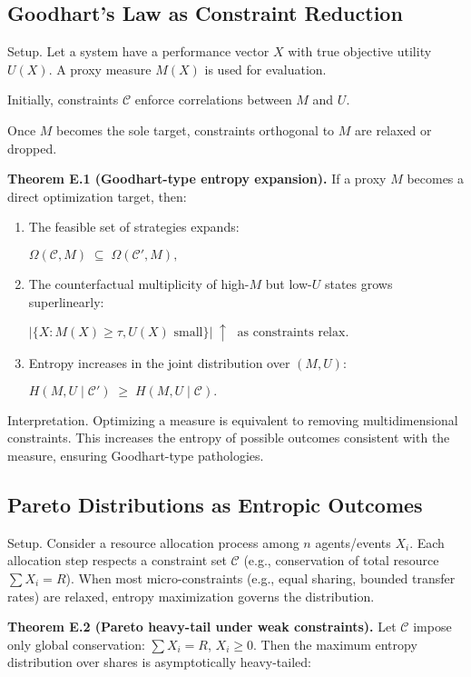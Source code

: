 \documentclass[12pt,a4paper]{article}
\begin{document}
\subsection{Goodhart’s Law as Constraint Reduction}

Setup.
Let a system have a performance vector $X$ with true objective utility $U(X)$. A proxy measure $M(X)$ is used for evaluation.

Initially, constraints $\mathcal{C}$ enforce correlations between $M$ and $U$.

Once $M$ becomes the sole target, constraints orthogonal to $M$ are relaxed or dropped.

\textbf{Theorem E.1 (Goodhart-type entropy expansion).} If a proxy $M$ becomes a direct optimization target, then:

\begin{enumerate}
\item The feasible set of strategies expands:

$\Omega(\mathcal{C}, M) \;\subseteq\; \Omega(\mathcal{C}', M),$

\item The counterfactual multiplicity of high-$M$ but low-$U$ states grows superlinearly:

$|\{X: M(X)\ge \tau, U(X) \text{ small}\}| \;\uparrow\; \text{ as constraints relax.}$

\item Entropy increases in the joint distribution over $(M,U)$:

$H(M,U\mid \mathcal{C}') \;\ge\; H(M,U\mid \mathcal{C}).$
\end{enumerate}

Interpretation. Optimizing a measure is equivalent to removing multidimensional constraints. This increases the entropy of possible outcomes consistent with the measure, ensuring Goodhart-type pathologies.

\subsection{Pareto Distributions as Entropic Outcomes}

Setup.
Consider a resource allocation process among $n$ agents/events $X_i$. Each allocation step respects a constraint set $\mathcal{C}$ (e.g., conservation of total resource $\sum X_i = R$). When most micro-constraints (e.g., equal sharing, bounded transfer rates) are relaxed, entropy maximization governs the distribution.

\textbf{Theorem E.2 (Pareto heavy-tail under weak constraints).} Let $\mathcal{C}$ impose only global conservation: $\sum X_i = R$, $X_i \geq 0$. Then the maximum entropy distribution over shares is asymptotically heavy-tailed:
\end{document}
